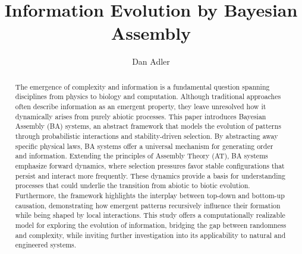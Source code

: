 \documentclass[preprint,12pt]{elsarticle}
\begin{document}
\begin{frontmatter}



\title{Information Evolution by Bayesian Assembly}


\author{Dan Adler} %


\begin{abstract}
The emergence of complexity and information is a fundamental question spanning disciplines from physics to biology and computation. Although traditional approaches often describe information as an emergent property, they leave unresolved how it dynamically arises from purely abiotic processes. This paper introduces Bayesian Assembly (BA) systems, an abstract framework that models the evolution of patterns through probabilistic interactions and stability-driven selection. By abstracting away specific physical laws, BA systems offer a universal mechanism for generating order and information. Extending the principles of Assembly Theory (AT), BA systems emphasize forward dynamics, where selection pressures favor stable configurations that persist and interact more frequently. These dynamics provide a basis for understanding processes that could underlie the transition from abiotic to biotic evolution. Furthermore, the framework highlights the interplay between top-down and bottom-up causation, demonstrating how emergent patterns recursively influence their formation while being shaped by local interactions. This study offers a computationally realizable model for exploring the evolution of information, bridging the gap between randomness and complexity, while inviting further investigation into its applicability to natural and engineered systems.
\end{abstract}


\end{frontmatter}
\end{document}
